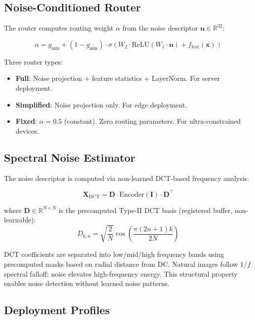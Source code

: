 \documentclass[conference]{IEEEtran}
\begin{document}
\subsection{Noise-Conditioned Router}

The router computes routing weight $\alpha$ from the noise descriptor $\mathbf{n} \in \mathbb{R}^{32}$:

\begin{equation}
\alpha = g_{\min} + (1 - g_{\min}) \cdot \sigma\!\left(W_2 \cdot \text{ReLU}(W_1 \cdot \mathbf{n}) + f_{\text{feat}}(\mathbf{x})\right)
\label{eq:router}
\end{equation}

Three router types:
\begin{itemize}
\item \textbf{Full}: Noise projection + feature statistics + LayerNorm. For server deployment.
\item \textbf{Simplified}: Noise projection only. For edge deployment.
\item \textbf{Fixed}: $\alpha = 0.5$ (constant). Zero routing parameters. For ultra-constrained devices.
\end{itemize}

\subsection{Spectral Noise Estimator}

The noise descriptor is computed via non-learned DCT-based frequency analysis:

\begin{equation}
\mathbf{X}_{\text{DCT}} = \mathbf{D} \cdot \text{Encoder}(\mathbf{I}) \cdot \mathbf{D}^\top
\end{equation}

where $\mathbf{D} \in \mathbb{R}^{N \times N}$ is the precomputed Type-II DCT basis (registered buffer, non-learnable):
\begin{equation}
D_{k,n} = \sqrt{\frac{2}{N}} \cos\!\left(\frac{\pi(2n+1)k}{2N}\right)
\end{equation}

DCT coefficients are separated into low/mid/high frequency bands using precomputed masks based on radial distance from DC. Natural images follow $1/f$ spectral falloff; noise elevates high-frequency energy. This structural property enables noise detection without learned noise patterns.

\subsection{Deployment Profiles}
\end{document}
